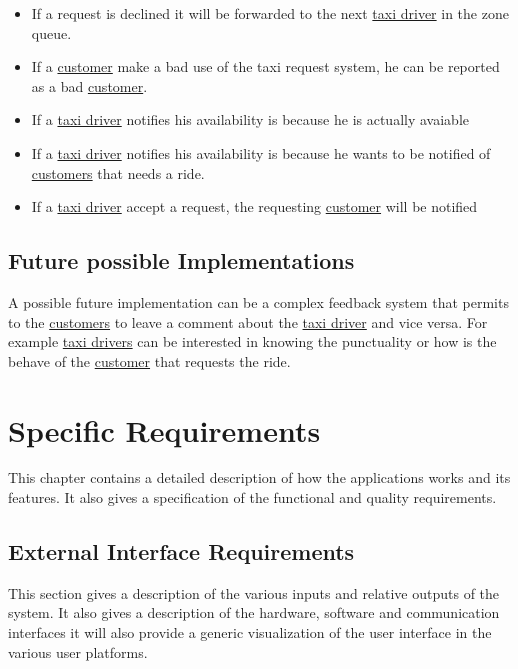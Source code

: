 \documentclass{report}
\begin{document}
\begin{itemize}
				\item If a request is declined it will be forwarded to the next \hyperref[sec:tdriver]{taxi driver} in the zone queue.

				\item If a \hyperref[sec:customer]{customer} make a bad use of the taxi request system, he can be reported as a bad \hyperref[sec:customer]{customer}.

				\item If a \hyperref[sec:tdriver]{taxi driver} notifies his availability is because he is actually avaiable

				\item If a \hyperref[sec:tdriver]{taxi driver} notifies his availability is because he wants to be notified of \hyperref[sec:customer]{customers} that needs a ride.

				\item If a \hyperref[sec:tdriver]{taxi driver} accept a request, the requesting \hyperref[sec:customer]{customer} will be notified
			\end{itemize}

	\section{Future possible Implementations}
	A possible future implementation can be a complex feedback system that permits to the \hyperref[sec:customer]{customers} to leave a comment about the \hyperref[sec:tdriver]{taxi driver} and vice versa.
	For example \hyperref[sec:tdriver]{taxi drivers} can be interested in knowing the punctuality or how is the behave of the \hyperref[sec:customer]{customer} that requests the ride.

\chapter{Specific Requirements}
This chapter contains a detailed description of how the applications works and its features. It also gives a specification of the functional and quality requirements.

	\section{External Interface Requirements}
	This section gives a description of the various inputs and relative outputs of the system. It also gives a description of the hardware, software and communication interfaces it will also provide a generic visualization of the user interface in the various user platforms.
\end{document}
